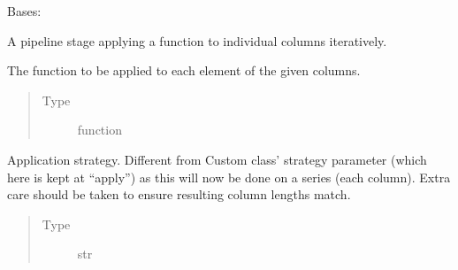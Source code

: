 \documentclass[letterpaper,10pt,english]{sphinxmanual}
\begin{document}
\begin{fulllineitems}
\label{\detokenize{dalio.pipe:dalio.pipe.col_generation.CustomByCols}}
Bases: {\hyperref[\detokenize{dalio.pipe:dalio.pipe.col_generation.Custom}]{}}

A pipeline stage applying a function to individual columns iteratively.

\begin{fulllineitems}
\label{\detokenize{dalio.pipe:dalio.pipe.col_generation.CustomByCols.func}}
The function to be applied to each element of the
given columns.
\begin{quote}\begin{description}
\item[{Type}] \leavevmode
function

\end{description}\end{quote}

\end{fulllineitems}


\begin{fulllineitems}
\label{\detokenize{dalio.pipe:dalio.pipe.col_generation.CustomByCols.strategy}}
Application strategy. Different from Custom class’
strategy parameter (which here is kept at “apply”) as this will
now be done on a series (each column). Extra care should be taken
to ensure resulting column lengths match.
\begin{quote}\begin{description}
\item[{Type}] \leavevmode
str

\end{description}\end{quote}


\end{fulllineitems}
\end{fulllineitems}
\end{document}
